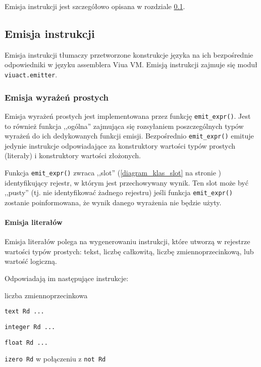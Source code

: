 Emisja instrukcji jest szczegółowo opisana w rozdziale \ref{viuact_cc_impl_desc_emit}.

\subsection{Emisja instrukcji}
\label{viuact_cc_impl_desc_emit}

Emisja instrukcji tłumaczy przetworzone konstrukcje języka \ViuAct\phantom{} na
ich bezpośrednie odpowiedniki w języku assemblera Viua VM. Emisją instrukcji
zajmuje się moduł \texttt{viuact.emitter}.

\subsubsection{Emisja wyrażeń prostych}

Emisja wyrażeń prostych jest implementowana przez funkcję \texttt{emit\_expr()}.
Jest to również funkcja ,,ogólna'' zajmująca się rozsyłaniem poszczególnych
typów wyrażeń do ich dedykowanych funkcji emisji. Bezpośrednio \texttt{emit\_expr()}
emituje jedynie instrukcje odpowiadające za konstruktory wartości typów prostych
(literały) i konstruktory wartości złożonych.

Funkcja \texttt{emit\_expr()} zwraca ,,slot'' (\ref{diagram_klas_slot} na
stronie \pageref{diagram_klas_slot}) identyfikujący rejestr, w którym jest
przechowywany wynik. Ten slot może być ,,pusty'' (tj. nie identyfikować żadnego
rejestru) jeśli funkcja \texttt{emit\_expr()} zostanie poinformowana, że wynik
danego wyrażenia nie będzie użyty.

\paragraph{Emisja literałów}

Emisja literałów polega na wygenerowaniu instrukcji, które utworzą w rejestrze
wartości typów prostych: tekst, liczbę całkowitą, liczbę zmiennoprzecinkową, lub
wartość logiczną.

Odpowiadają im następujące instrukcje:

\begin{labeling}{liczba zmiennoprzecinkowa}
\item[tekst] \texttt{text Rd ...}
\item[liczba całkowita] \texttt{integer Rd ...}
\item[liczba zmiennoprzecinkowa] \texttt{float Rd ...}
\item[wartość logiczna] \texttt{izero Rd} w połączeniu z \texttt{not Rd}
\end{labeling}

